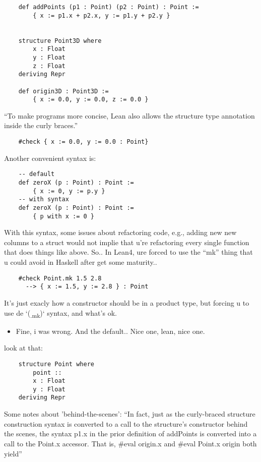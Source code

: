\documentclass[11pt]{scrlttr2}
\begin{document}
\begin{letter}{%
\mbox{}}
\begin{verbatim}
    def addPoints (p1 : Point) (p2 : Point) : Point :=
        { x := p1.x + p2.x, y := p1.y + p2.y }


    structure Point3D where
        x : Float
        y : Float
        z : Float
    deriving Repr

    def origin3D : Point3D :=
        { x := 0.0, y := 0.0, z := 0.0 }
\end{verbatim}

``To make programs more concise, Lean also allows the structure type annotation inside the curly braces.''
\begin{verbatim}
    #check { x := 0.0, y := 0.0 : Point}
\end{verbatim}

Another convenient syntax is:
\begin{verbatim}
    -- default
    def zeroX (p : Point) : Point :=
        { x := 0, y := p.y }
    -- with syntax
    def zeroX (p : Point) : Point :=
        { p with x := 0 }
\end{verbatim}

With this syntax, some issues about refactoring code, e.g., adding new
new columns to a struct would not implie that u're refactoring every
single function that does things like above.
So.. In Lean4, ure forced to use the ``mk'' thing that
u could avoid in Haskell after get some maturity..
\begin{verbatim}
    #check Point.mk 1.5 2.8
      --> { x := 1.5, y := 2.8 } : Point
\end{verbatim}
It's just exacly how a constructor should be in a product type,
but forcing u to use de `(\textsubscript{.mk})` syntax, and what's ok.

\begin{itemize}
\item Fine, i was wrong. And the default.. Nice one, lean, nice one.
\end{itemize}
look at that:
\begin{verbatim}
    structure Point where
        point ::
        x : Float
        y : Float
    deriving Repr
\end{verbatim}

Some notes about 'behind-the-scenes':
``In fact, just as the curly-braced structure construction syntax is converted to a call to the structure's constructor behind the scenes, the syntax p1.x in the prior definition of addPoints is converted into a call to the Point.x accessor. That is, \#eval origin.x and \#eval Point.x origin both yield''


\end{letter}
\end{document}
